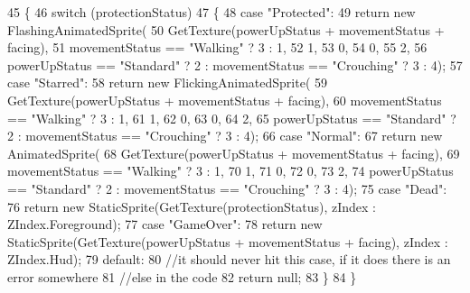\begin{DoxyCode}
45         \{
46             \textcolor{keywordflow}{switch} (protectionStatus)
47             \{
48                 \textcolor{keywordflow}{case} \textcolor{stringliteral}{"Protected"}:
49                     \textcolor{keywordflow}{return} \textcolor{keyword}{new} FlashingAnimatedSprite(
50                         GetTexture(powerUpStatus + movementStatus + facing),
51                         movementStatus == \textcolor{stringliteral}{"Walking"} ? 3 : 1,
52                         1,
53                         0,
54                         0,
55                         2,
56                         powerUpStatus == \textcolor{stringliteral}{"Standard"} ? 2 : movementStatus == \textcolor{stringliteral}{"Crouching"} ? 3 : 4);
57                 \textcolor{keywordflow}{case} \textcolor{stringliteral}{"Starred"}:
58                     \textcolor{keywordflow}{return} \textcolor{keyword}{new} FlickingAnimatedSprite(
59                         GetTexture(powerUpStatus + movementStatus + facing),
60                         movementStatus == \textcolor{stringliteral}{"Walking"} ? 3 : 1,
61                         1,
62                         0,
63                         0,
64                         2,
65                         powerUpStatus == \textcolor{stringliteral}{"Standard"} ? 2 : movementStatus == \textcolor{stringliteral}{"Crouching"} ? 3 : 4);
66                 \textcolor{keywordflow}{case} \textcolor{stringliteral}{"Normal"}:
67                     \textcolor{keywordflow}{return} \textcolor{keyword}{new} AnimatedSprite(
68                         GetTexture(powerUpStatus + movementStatus + facing),
69                         movementStatus == \textcolor{stringliteral}{"Walking"} ? 3 : 1,
70                         1,
71                         0,
72                         0,
73                         2,
74                         powerUpStatus == \textcolor{stringliteral}{"Standard"} ? 2 : movementStatus == \textcolor{stringliteral}{"Crouching"} ? 3 : 4);
75                 \textcolor{keywordflow}{case} \textcolor{stringliteral}{"Dead"}:
76                     \textcolor{keywordflow}{return} \textcolor{keyword}{new} StaticSprite(GetTexture(protectionStatus), zIndex : 
      ZIndex.Foreground);
77                 \textcolor{keywordflow}{case} \textcolor{stringliteral}{"GameOver"}:
78                     \textcolor{keywordflow}{return} \textcolor{keyword}{new} StaticSprite(GetTexture(powerUpStatus + movementStatus + facing), zIndex : 
      ZIndex.Hud);
79                 \textcolor{keywordflow}{default}:
80                     \textcolor{comment}{//it should never hit this case, if it does there is an error somewhere}
81                     \textcolor{comment}{//else in the code}
82                     \textcolor{keywordflow}{return} null;
83             \}
84         \}
\end{DoxyCode}
